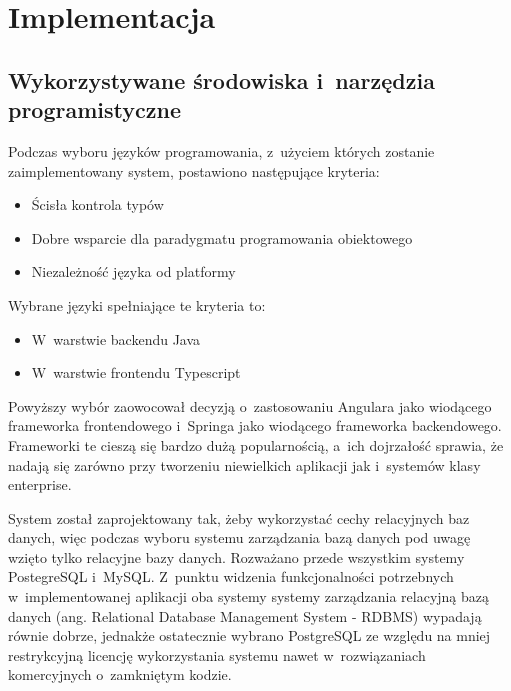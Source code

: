 \chapter{Implementacja}\label{ch:implementation}
\section{Wykorzystywane środowiska i~narzędzia programistyczne}\label{sec:dev-tools}
Podczas wyboru języków programowania, z~użyciem których zostanie zaimplementowany system, postawiono następujące kryteria:

\begin{itemize}
    \item Ścisła kontrola typów
    \item Dobre wsparcie dla paradygmatu programowania obiektowego
    \item Niezależność języka od platformy
\end{itemize}

Wybrane języki spełniające te kryteria to:

\begin{itemize}
    \item W~warstwie backendu Java\cite{tech:java}
    \item W~warstwie frontendu Typescript\cite{tech:typescript}
\end{itemize}

Powyższy wybór zaowocował decyzją o~zastosowaniu Angulara\cite{tech:angular} jako wiodącego frameworka frontendowego
i~Springa\cite{tech:spring} jako wiodącego frameworka backendowego.
Frameworki te cieszą się bardzo dużą popularnością, a~ich dojrzałość sprawia,
że nadają się zarówno przy tworzeniu niewielkich aplikacji jak i~systemów klasy enterprise.

\par
{}

\par
System został zaprojektowany tak, żeby wykorzystać cechy relacyjnych baz danych,
więc podczas wyboru systemu zarządzania bazą danych pod uwagę wzięto tylko relacyjne bazy danych.
Rozważano przede wszystkim systemy PostegreSQL\cite{tech:postgresql} i~MySQL\cite{tech:mysql}.
Z~punktu widzenia funkcjonalności potrzebnych w~implementowanej aplikacji oba systemy systemy zarządzania relacyjną bazą danych (ang. Relational Database Management System - RDBMS) wypadają równie dobrze,
jednakże ostatecznie wybrano PostgreSQL ze względu na mniej restrykcyjną licencję wykorzystania systemu nawet w~rozwiązaniach komercyjnych o~zamkniętym kodzie.
\par
{}

